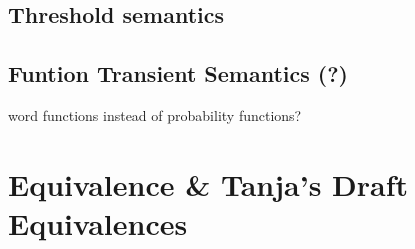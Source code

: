             \begin{definition}
            \end{definition}
                       
        
        \subsection{Threshold semantics}
            
        
        \subsection{Funtion Transient Semantics (?)}
        word functions instead of probability functions?
           
        
        
        
        
        
        
    \section{Equivalence \& Tanja's Draft Equivalences}
        
